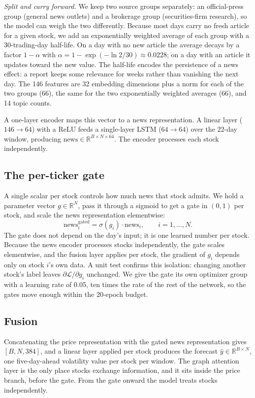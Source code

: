 \documentclass[runningheads]{llncs}
\begin{document}
\emph{Split and carry forward.} We keep two source groups separately: an official-press group
(general news outlets) and a brokerage group (securities-firm research), so the model can weigh the
two differently. Because most days carry no fresh article for a given stock, we add an
exponentially weighted average of each group with a 30-trading-day half-life. On a day with no new
article the average decays by a factor $1-\alpha$ with $\alpha=1-\exp(-\ln 2/30)\approx 0.0228$;
on a day with an article it updates toward the new value. The half-life encodes the persistence of
a news effect: a report keeps some relevance for weeks rather than vanishing the next day. The 146
features are 32 embedding dimensions plus a norm for each of the two groups (66), the same for the
two exponentially weighted averages (66), and 14 topic counts.

A one-layer encoder maps this vector to a news representation. A linear layer
($146\to 64$) with a ReLU feeds a single-layer LSTM ($64\to 64$) over the 22-day window, producing
$\text{news}\in\mathbb{R}^{B\times N\times 64}$. The encoder processes each stock independently.

\subsection{The per-ticker gate}
\label{sec:gate}
A single scalar per stock controls how much news that stock admits. We hold a parameter vector
$g\in\mathbb{R}^{N}$, pass it through a sigmoid to get a gate in $(0,1)$ per stock, and scale the
news representation elementwise:
\begin{equation}
\text{news}^{\text{gated}}_{i} = \sigma(g_i)\cdot \text{news}_{i}, \qquad i=1,\dots,N.
\label{eq:gate}
\end{equation}
The gate does not depend on the day's input; it is one learned number per stock. Because the news
encoder processes stocks independently, the gate scales elementwise, and the fusion layer applies
per stock, the gradient of $g_i$ depends only on stock $i$'s own data. A unit test confirms this
isolation: changing another stock's label leaves $\partial\mathcal{L}/\partial g_i$ unchanged. We
give the gate its own optimizer group with a learning rate of 0.05, ten times the rate of the rest
of the network, so the gates move enough within the 20-epoch budget.

\subsection{Fusion}
Concatenating the price representation with the gated news representation gives
$[B,N,384]$, and a linear layer applied per stock produces the forecast
$\hat{y}\in\mathbb{R}^{B\times N}$, one five-day-ahead volatility value per stock per window. The
graph attention layer is the only place stocks exchange information, and it sits inside the price
branch, before the gate. From the gate onward the model treats stocks independently.
\end{document}
